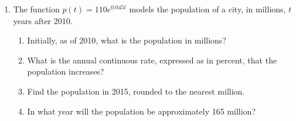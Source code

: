 \documentclass[12pt, oneside]{article}
\begin{document}
\begin{enumerate}
\item The function $p(t)=110e^{0.045t}$ models the population of a city, in millions, $t$ years after 2010.
\begin{enumerate}
    \item Initially, as of 2010, what is the population in millions?%
        \begin{flushright}[1]\end{flushright}
    \item What is the annual continuous rate, expressed as in percent, that the population increases?%
        \begin{flushright}[1]\end{flushright}
    \item Find the population in 2015, rounded to the nearest million.\\[60pt]
        \begin{flushright}[2]\end{flushright}
    \item In what year will the population be approximately 165 million?
        \begin{flushright}[2]\end{flushright}
\end{enumerate}



\end{enumerate}
\end{document}
